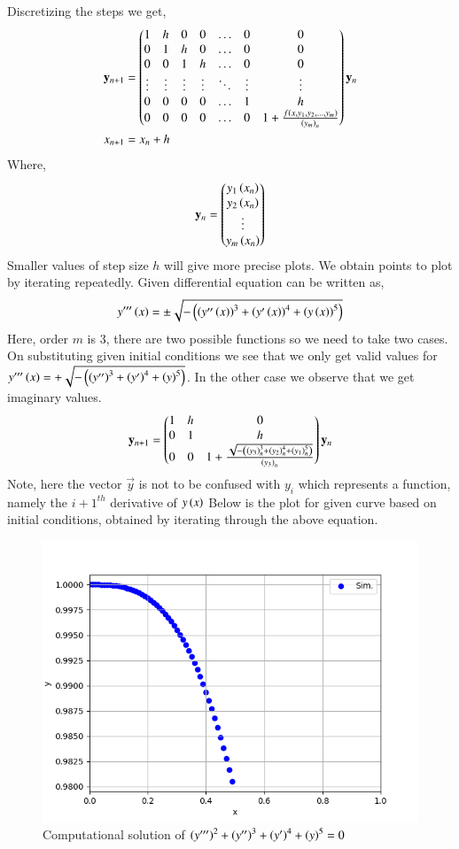 \documentclass[journal]{IEEEtran}
\begin{document}
Discretizing the steps we get,
\begin{align}
  \mathbf{y}_{n+1}&=\begin{pmatrix}1 & h & 0 & 0 & \dots & 0 & 0\\ 0 & 1 & h & 0 & \dots & 0 & 0\\0 & 0 & 1 & h & \dots & 0 & 0\\\vdots & \vdots & \vdots & \vdots& \ddots & \vdots & \vdots\\
  0 & 0 & 0 & 0 & \dots & 1 & h\\0 & 0 & 0 & 0 & \dots & 0 &1+\frac{f\left(x, y_1, y_2, \dots, y_m\right)}{\left(y_m\right)_n}\end{pmatrix}\mathbf{y}_{n}\\
    x_{n+1}&=x_n+h  
\end{align}
Where,
\begin{align}
  \mathbf{y}_n=\begin{pmatrix}y_1\left(x_n\right) \\ y_2\left(x_n\right) \\ \vdots \\ y_m\left(x_n\right)\end{pmatrix}
\end{align}
Smaller values of step size $h$ will give more precise plots. We obtain points to plot by iterating repeatedly. 
Given differential equation can be written as,
\begin{align}
    y^{\prime \prime \prime}\left(x\right) = \pm \sqrt{-\left(\left(y^{\prime \prime}\left(x\right)\right)^3 + \left(y^{\prime}\left(x\right)\right)^4 + \left(y\left(x\right)\right)^5 \right)}
\end{align}
Here, order $m$ is 3, there are two possible functions so we need to take two cases. On substituting given initial conditions we see that we only get valid values for $y^{\prime \prime \prime}\left(x\right) = + \sqrt{-\left(\left(y^{\prime \prime}\right)^3 + \left(y^{\prime}\right)^4 + \left(y\right)^5 \right)}$. In the other case we observe that we get imaginary values.
\begin{align}
  \mathbf{y}_{n+1}=\begin{pmatrix}1 & h & 0 \\ 0 & 1 & h \\ 0 & 0 & 1+\frac{\sqrt{-\left(\left(y_3\right)_n^3 + \left(y_2\right)_n^4 + \left(y_1\right)_n^5\right)} }{\left(y_3\right)_n}\end{pmatrix}\mathbf{y}_{n}
\end{align}
Note, here the vector $\vec{y}$ is not to be confused with $y_i$ which represents a function, namely the ${i+1}^{th}$ derivative of $y\left(x\right)$ Below is the plot for given curve  based on initial conditions, obtained by iterating through the above equation.
\begin{figure}[h!]
   \centering
   \includegraphics[width=1\columnwidth]{figs/fig1.png}
   \caption{Computational solution of $\left(y^{\prime \prime \prime}\right)^2 + \left(y^{\prime \prime}\right)^3 + \left(y^{\prime}\right)^4 + \left(y\right)^5 = 0$}
   \label{stemplot}
\end{figure}
\end{document}
